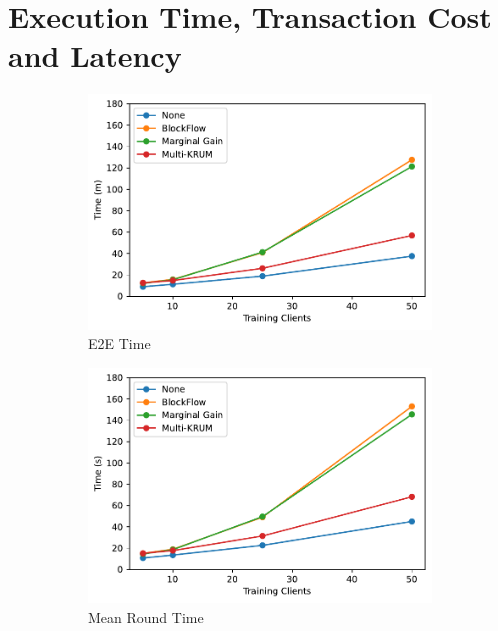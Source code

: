\section{Execution Time, Transaction Cost and Latency}

\begin{figure}[!ht]
    \centering
    \begin{subfigure}[b]{0.49\textwidth}
        \centering
        \includegraphics[width=\textwidth]{graphics/clients/e2e.pdf}
        \caption{E2E Time}
    \end{subfigure}
    \hfill
    \begin{subfigure}[b]{0.49\textwidth}
        \centering
        \includegraphics[width=\textwidth]{graphics/clients/round.pdf}
        \caption{Mean Round Time}
    \end{subfigure}
    \hfill
    \begin{subfigure}[b]{0.49\textwidth}

\end{subfigure}
\end{figure}
